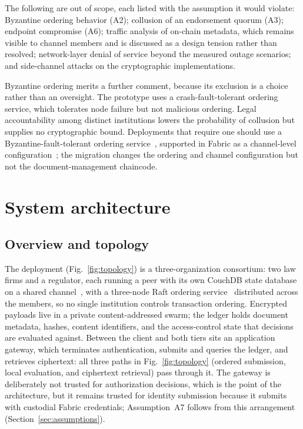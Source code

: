 \documentclass[preprint,12pt]{elsarticle}
\begin{document}
The following are out of scope, each listed with the assumption it would
violate: Byzantine ordering behavior (A2); collusion of an endorsement quorum
(A3); endpoint compromise (A6); traffic analysis of on-chain metadata, which
remains visible to channel members and is discussed as a design tension rather
than resolved; network-layer denial of service beyond the measured outage
scenarios; and side-channel attacks on the cryptographic implementations.

Byzantine ordering merits a further comment, because its exclusion is a choice
rather than an oversight. The prototype uses a crash-fault-tolerant ordering
service, which tolerates node failure but not malicious ordering. Legal
accountability among distinct institutions lowers the probability of collusion
but supplies no cryptographic bound. Deployments that require one should use a
Byzantine-fault-tolerant ordering
service~\cite{castro1999pbft,stathakopoulou2022smartbft}, supported in Fabric
as a channel-level configuration~\cite{fabricBFTConfigurationDoc}; the
migration changes the ordering and channel configuration but not the
document-management chaincode.


\section{System architecture}
\label{sec:architecture}

\subsection{Overview and topology}
\label{sec:topology}

The deployment (Fig.~\ref{fig:topology}) is a three-organization consortium: two law firms and a
regulator, each running a peer with its own CouchDB state
database~\cite{fabricCouchDBStateDB_v24} on a shared
channel~\cite{fabricChannelsDoc},
with a three-node Raft ordering
service~\cite{Ongaro2014,hyperledgerFabricOrderingService_v24} distributed
across the members, so no single institution controls transaction ordering. Encrypted payloads live in a
private content-addressed swarm; the ledger holds document metadata, hashes,
content identifiers, and the access-control state that decisions are evaluated
against. Between the client and both tiers sits an application gateway, which
terminates authentication, submits and queries the ledger, and retrieves
ciphertext: all three paths in Fig.~\ref{fig:topology} (ordered
submission, local evaluation, and ciphertext retrieval) pass through it.
The gateway is deliberately not trusted for authorization decisions, which
is the point of the architecture, but it remains trusted for identity
submission because it submits with custodial Fabric credentials; Assumption~A7
follows from this arrangement (Section~\ref{sec:assumptions}).
\end{document}

